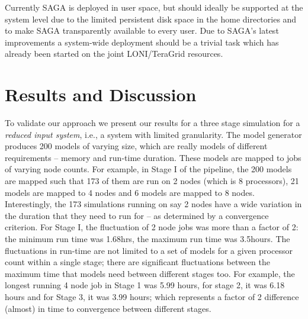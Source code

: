 \documentclass[conference,final]{IEEEtran}
\newcommand{\jha}[0]{}
\begin{document}
Currently SAGA is deployed in user space, but should ideally be
supported at the system level due to the limited persistent disk space
in the home directories and to make SAGA transparently available to
every user.  Due to SAGA's latest improvements a system-wide
deployment should be a trivial task which has already been started on
the joint LONI/TeraGrid resources.



\section{Results and Discussion}

To validate our approach we present our results for a three stage
simulation for a {\it reduced input system}, i.e., a system with
limited granularity. The model generator produces 200 models of
varying size, which are really models of different requirements --
memory and run-time duration. These models are mapped to jobs of
varying node counts.  For example, in Stage I of the pipeline, the 200
models are mapped such that 173 of them are run on 2 nodes (which is 8
processors), 21 models are mapped to 4 nodes and 6 models are mapped
to 8 nodes.  Interestingly, the 173 simulations running on say 2 nodes
have a wide variation in the duration that they need to run for -- as
determined by a convergence criterion. For Stage I, the fluctuation of
2 node jobs was more than a factor of 2: the minimum run time was
1.68hrs, the maximum run time was 3.5hours. The fluctuations in
run-time are not limited to a set of models for a given processor
count within a single stage; there are significant fluctuations
between the maximum time that models need between different stages
too.  For example, the longest running 4 node job in Stage 1 was 5.99
hours, for stage 2, it was 6.18 hours and for Stage 3, it was 3.99
hours; which represents a factor of 2 difference (almost) in time to
convergence between different stages.
\end{document}
